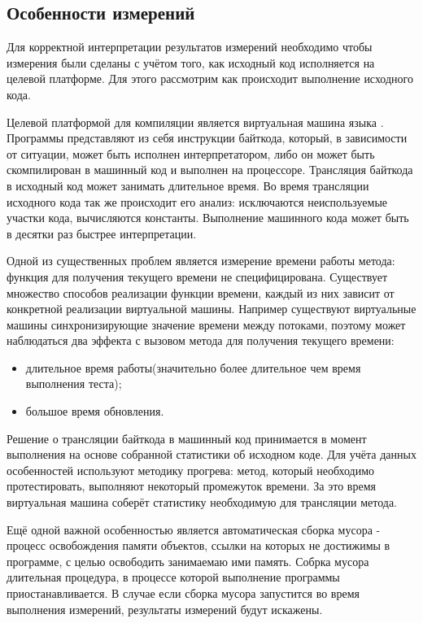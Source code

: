 \subsection{Особенности измерений} \label{measurement_details}
Для корректной интерпретации результатов измерений необходимо чтобы измерения были сделаны с учётом того, как исходный код исполняется на целевой платформе. Для этого рассмотрим как происходит выполнение исходного кода.

Целевой платформой для компиляции является виртуальная машина языка . Программы представляют из себя инструкции байткода, который, в зависимости от ситуации, может быть исполнен интерпретатором, либо он может быть скомпилирован в машинный код и выполнен на процессоре. Трансляция байткода в исходный код может занимать длительное время. Во время трансляции исходного кода так же происходит его анализ: исключаются неиспользуемые участки кода, вычисляются константы. Выполнение машинного кода может быть в десятки раз быстрее интерпретации.

Одной из существенных проблем является измерение времени работы метода: функция для получения текущего времени не специфицирована. Существует множество способов реализации функции времени, каждый из них зависит от конкретной реализации виртуальной машины. Например существуют виртуальные машины синхронизирующие значение времени между потоками, поэтому может наблюдаться два эффекта с вызовом метода для получения текущего времени:
\begin{itemize}
  \item длительное время работы(значительно более длительное чем время выполнения теста);
  \item большое время обновления.
\end{itemize}

Решение о трансляции байткода в машинный код принимается в момент выполнения на основе собранной статистики об исходном коде. Для учёта данных особенностей используют методику прогрева: метод, который необходимо протестировать, выполняют некоторый промежуток времени. За это время виртуальная машина соберёт статистику необходимую для трансляции метода.

Ещё одной важной особенностью является автоматическая сборка мусора - процесс освобождения памяти объектов, ссылки на которых не достижимы в программе, с целью освободить занимаемаю ими память. Собрка мусора длительная процедура, в процессе которой выполнение программы приостанавливается. В случае если сборка мусора запустится во время выполнения измерений, результаты измерений будут искажены.

